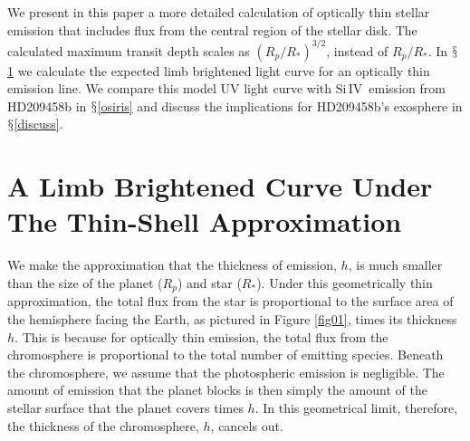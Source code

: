 \documentclass[manuscript]{aastex}
\newcommand{\siIV}{\ensuremath{\mathrm{Si}\,\scriptstyle \mathrm{IV}}}
\begin{document}
We present in this paper a more detailed calculation of optically thin stellar emission that includes flux from the central region of the stellar disk. The calculated maximum transit depth scales as $(R_p/R_*)^{3/2}$, instead of $R_p/R_*$. In
$\mathsection$\ref{labl:chromlcurve} we calculate the expected limb
brightened light curve for an optically thin emission line. We
compare this model UV light curve with \siIV\ emission from HD209458b in  $\mathsection$\ref{osiris} and discuss the implications for HD209458b's exosphere in $\mathsection$\ref{discuss}.

\section{A Limb Brightened Curve Under The Thin-Shell Approximation} \label{labl:chromlcurve}
\label{labl:thinshell}

We make the approximation that the thickness of emission, $h$, is much smaller than the size of the planet ($R_p$) and star ($R_*$). Under this geometrically thin approximation, the total flux from the star is proportional to the surface area of the hemisphere facing the Earth, as pictured in Figure \ref{fig01}, times its thickness $h$. This is because for optically thin emission, the total flux from the chromosphere is proportional to the total number of emitting species. Beneath the chromosphere, we assume that the photospheric emission is negligible. The amount of emission that the planet blocks is then simply the amount of the stellar surface that the planet covers times $h$. In this geometrical limit, therefore, the thickness of the chromosphere, $h$, cancels out.


\end{document}
